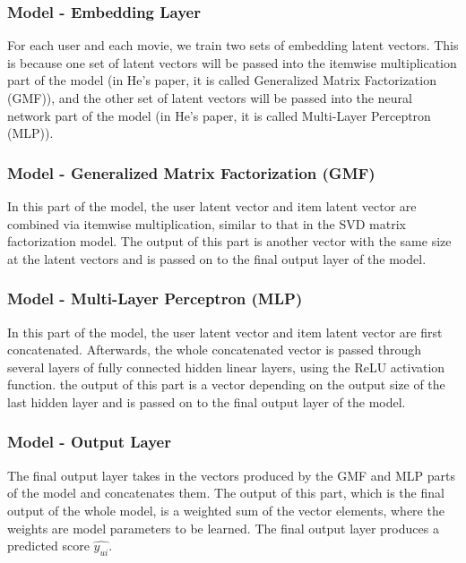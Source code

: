 \documentclass[final]{cvpr}
\begin{document}
\subsubsection{Model - Embedding Layer}

For each user and each movie, we train two sets of embedding latent vectors. This is because one set of latent
vectors will be passed into the itemwise multiplication part
of the model (in He’s paper, it is called Generalized Matrix
Factorization (GMF)), and the other set of latent vectors will
be passed into the neural network part of the model (in He’s
paper, it is called Multi-Layer Perceptron (MLP)).

\subsubsection{Model - Generalized Matrix Factorization (GMF)}

In this part of the model, the user latent vector and item latent vector are combined via itemwise multiplication, similar to that in the SVD matrix factorization model. The output of this part is another vector with the same size at the latent vectors and is passed on to the final output layer of the model.

\subsubsection{Model - Multi-Layer Perceptron (MLP)}

In this part of the model, the user latent vector and item latent vector are first concatenated. Afterwards, the whole concatenated vector is passed through several layers of fully connected hidden linear layers, using the ReLU activation function. the output of this part is a vector depending on the output size of the last hidden layer and is passed on to the final output layer of the model.

\subsubsection{Model - Output Layer}

The final output layer takes in the vectors produced by the GMF and MLP parts of the model and concatenates them. The output of this part, which is the final output of the whole model, is a weighted sum of the vector elements, where the weights are model parameters to be learned. The final output layer produces a predicted score $\hat{y_{ui}}$.
\end{document}
